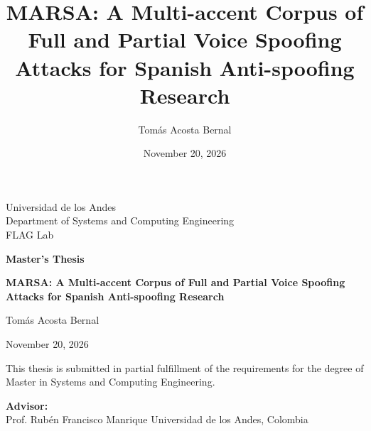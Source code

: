 \documentclass[11pt]{report}
\title{\textbf{MARSA: A Multi-accent Corpus of Full and Partial Voice
Spoofing Attacks for Spanish Anti-spoofing Research}}
\author{Tom\'as Acosta Bernal}
\date{November 20, 2026}
\begin{document}
\begin{titlepage}
\centering
\vspace*{1cm}
{\large Universidad de los Andes\\
Department of Systems and Computing Engineering\\
FLAG Lab\par}
\vspace{2cm}
{\Large\bfseries Master's Thesis\par}
\vspace{1cm}
{\huge\bfseries MARSA: A Multi-accent Corpus of Full and Partial Voice
Spoofing Attacks for Spanish Anti-spoofing Research\par}
\vspace{2cm}
{\Large Tom\'as Acosta Bernal\par}
\vspace{0.5cm}
{\large November 20, 2026\par}
\vfill
{\large This thesis is submitted in partial fulfillment of the
requirements for the degree of Master in Systems and Computing
Engineering.\par}
\vspace{1cm}
\begin{flushleft}
\textbf{Advisor:}\\
Prof. Rub\'en Francisco Manrique \hfill Universidad de los Andes, Colombia
\end{flushleft}
\end{titlepage}
\end{document}
